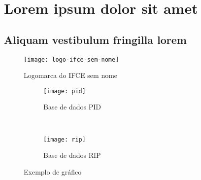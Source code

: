 \chapter{Lorem ipsum dolor sit amet}\label{cap:exampleChapter}
\section{Aliquam vestibulum fringilla lorem}

\lipsum[1]

\begin{figure}[h]\label{fig:logo-ifce-sem-nome}
	\begin{center}
		\texttt{[image: logo-ifce-sem-nome]}
		\caption{Logomarca do IFCE sem nome}
	\end{center}
\end{figure}
\lipsum[2-3]


\lipsum[2-3]
\begin{figure}
    \centering
    \begin{subfigure}[b]{0.45\textwidth}
        \texttt{[image: pid]}
        \caption{Base de dados PID}
        \label{fig:pid}
    \end{subfigure}
    ~ 
    \begin{subfigure}[b]{0.45\textwidth}
        \texttt{[image: rip]}
        \caption{Base de dados RIP}
        \label{fig:rip}
    \end{subfigure}
    \caption{Exemplo de gráfico}\label{fig:animals}
\end{figure}
\lipsum[1]